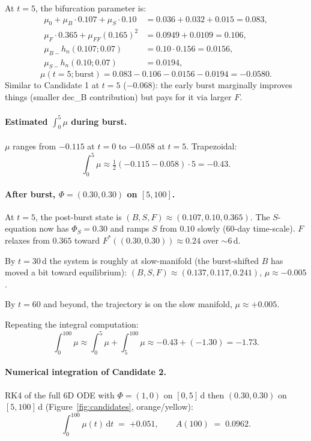 \documentclass[11pt,a4paper]{article}
\theoremstyle{definition}
\newcommand{\dd}{\,\mathrm{d}}
\begin{document}
At $t = 5$, the bifurcation parameter is:
\begin{align*}
\mu_0 + \mu_B \cdot 0.107 + \mu_S \cdot 0.10 &= 0.036 + 0.032 + 0.015 = 0.083, \\
\mu_F \cdot 0.365 + \mu_{FF}(0.165)^2 &= 0.0949 + 0.0109 = 0.106, \\
\mu_{B-} h_n(0.107; 0.07) &= 0.10 \cdot 0.156 = 0.0156, \\
\mu_{S-} h_n(0.10; 0.07) &= 0.0194,
\end{align*}
\[
\mu(t = 5; \text{burst}) = 0.083 - 0.106 - 0.0156 - 0.0194 = -0.0580.
\]
Similar to Candidate 1 at $t = 5$ ($-0.068$): the early burst marginally improves things (smaller dec\_B contribution) but pays for it via larger $F$.

\paragraph{Estimated $\int_0^5 \mu$ during burst.} $\mu$ ranges from $-0.115$ at $t = 0$ to $-0.058$ at $t = 5$. Trapezoidal:
\[
\int_0^5 \mu \approx \tfrac{1}{2}(-0.115 - 0.058) \cdot 5 = -0.43.
\]

\paragraph{After burst, $\Phi = (0.30, 0.30)$ on $[5, 100]$.}
At $t = 5$, the post-burst state is $(B, S, F) \approx (0.107, 0.10, 0.365)$. The $S$-equation now has $\Phi_S = 0.30$ and ramps $S$ from $0.10$ slowly (60-day time-scale). $F$ relaxes from $0.365$ toward $F^*((0.30, 0.30)) \approx 0.24$ over $\sim 6$\,d.

By $t = 30$\,d the system is roughly at slow-manifold (the burst-shifted $B$ has moved a bit toward equilibrium): $(B, S, F) \approx (0.137, 0.117, 0.241)$, $\mu \approx -0.005$.

By $t = 60$ and beyond, the trajectory is on the slow manifold, $\mu \approx +0.005$.

Repeating the integral computation:
\[
\int_0^{100} \mu \approx \int_0^5 \mu + \int_5^{100} \mu \approx -0.43 + (-1.30) = -1.73.
\]

\paragraph{Numerical integration of Candidate 2.}
RK4 of the full 6D ODE with $\Phi = (1, 0)$ on $[0, 5]$\,d then $(0.30, 0.30)$ on $[5, 100]$\,d (Figure~\ref{fig:candidates}, orange/yellow):
\[
\int_0^{100} \mu(t)\dd t \;=\; \mathbf{+0.051},
\qquad A(100) \;=\; 0.0962.
\]
\end{document}
